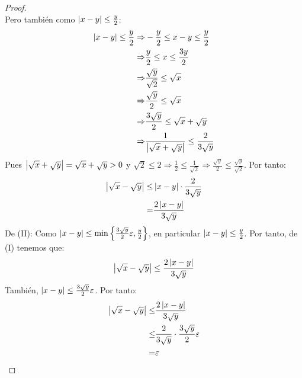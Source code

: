\documentclass[12pt]{article}
\begin{document}
\begin{enumerate}
\begin{proof}
\begin{equation*}
        \end{equation*}
        Pero también como $\left| x-y \right|\leq\frac{y}{2}$:
            \begin{equation*}
                \begin{split}
                    \left| x-y \right|\leq\frac{y}{2}\Rightarrow&-\frac{y}{2}\leq x-y\leq\frac{y}{2}\\
                        \Rightarrow&\frac{y}{2}\leq x\leq\frac{3y}{2}\\
                        \Rightarrow&\frac{\sqrt{y}}{\sqrt{2}}\leq \sqrt{x}\\
                        \Rightarrow&\frac{\sqrt{y}}{2}\leq \sqrt{x}\\
                        \Rightarrow&\frac{3\sqrt{y}}{2}\leq \sqrt{x}+\sqrt{y}\\
                        \Rightarrow&\frac{1}{\left| \sqrt{x}+\sqrt{y} \right|}\leq\frac{2}{3\sqrt{y}}
                \end{split}
            \end{equation*}
            Pues $\left| \sqrt{x}+\sqrt{y} \right|=\sqrt{x}+\sqrt{y}>0$ y $\sqrt{2}\leq2\Rightarrow\frac{1}{2}\leq\frac{1}{\sqrt{2}}\Rightarrow\frac{\sqrt{y}}{2}\leq\frac{\sqrt{y}}{\sqrt{2}}$. Por tanto:
            \begin{equation*}
                \begin{split}
                    \left| \sqrt{x}-\sqrt{y} \right|\leq&\left| x-y \right|\cdot\frac{2}{3\sqrt{y}}\\
                    =&\frac{2\left| x-y \right|}{3\sqrt{y}}
                \end{split}
            \end{equation*}
            De (II): Como $\left| x-y \right|\leq\min\left\{\frac{3\sqrt{y}}{2}\varepsilon,\frac{y}{2}\right\}$, en particular $\left| x-y \right|\leq\frac{y}{2}$. Por tanto, de (I) tenemos que:
            \begin{equation*}
                \left| \sqrt{x}-\sqrt{y} \right|\leq\frac{2\left| x-y \right|}{3\sqrt{y}}
            \end{equation*}
            También, $\left| x-y \right|\leq\frac{3\sqrt{y}}{2}\varepsilon$. Por tanto:
            \begin{equation*}
                \begin{split}
                    \abs{\sqrt{x}-\sqrt{y}}\leq&\frac{2\abs{x-y}}{3\sqrt{y}}\\
                    \leq&\frac{2}{3\sqrt{y}}\cdot\frac{3\sqrt{y}}{2}\varepsilon\\
                    =&\varepsilon\\

\end{split}
\end{equation*}
\end{proof}
\end{enumerate}
\end{document}
